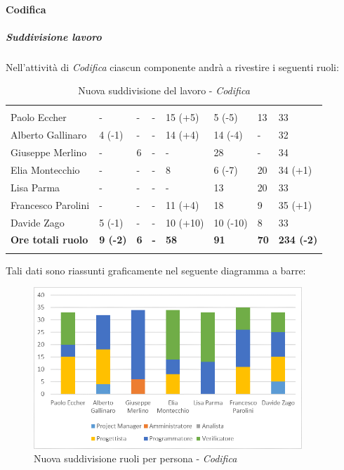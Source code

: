\paragraph{Codifica}\Spazio
	\subparagraph{Suddivisione lavoro} \Spazio
	Nell'attività di \textit{Codifica} ciascun componente andrà a rivestire i seguenti ruoli:
	\begin{table}[H]
		\centering
		\begin{tabular}{|C{4cm}|C{0.8cm}|C{0.8cm}|C{0.8cm}|C{0.9cm}|C{0.9cm}|C{0.8cm}|C{2.5cm}|}
			 & & &&&&&\\
			Paolo Eccher      & - & - & - & 15 (+5) & 5 (-5) & 13 & 33 \\
			\hline
			Alberto Gallinaro & 4 (-1) & - & - & 14 (+4) & 14 (-4) & - & 32 \\
			\hline
			Giuseppe Merlino  & - & 6 & - & - & 28 & - & 34 \\
			\hline
			Elia Montecchio   & - & - & - & 8 & 6 (-7) & 20 & 34 (+1) \\
			\hline
			Lisa Parma        & - & - & - & - & 13 & 20 & 33 \\
			\hline
			Francesco Parolini& - & - & - & 11 (+4) & 18 & 9 & 35 (+1) \\
			\hline
			Davide Zago       & 5 (-1) & - & - & 10 (+10) & 10 (-10) & 8 & 33 \\
			\hline
			\textbf{Ore totali ruolo}  & \textbf{9 (-2)} & \textbf{6} & \textbf{-} & \textbf{58} & \textbf{91} & \textbf{70} & \textbf{234 (-2)} \\
		\end{tabular}
		\caption{Nuova suddivisione del lavoro - \textit{Codifica}}
	\end{table}
	
	Tali dati sono riassunti graficamente nel seguente diagramma a barre:

	\begin{figure}[H] 
		\centering 
		\includegraphics[width=0.9\textwidth]{images/BarreCodificaNuova.png} 
		\caption{Nuova suddivisione ruoli per persona - \textit{Codifica}}
		\label{BarreCodifica}
	\end{figure}
	
